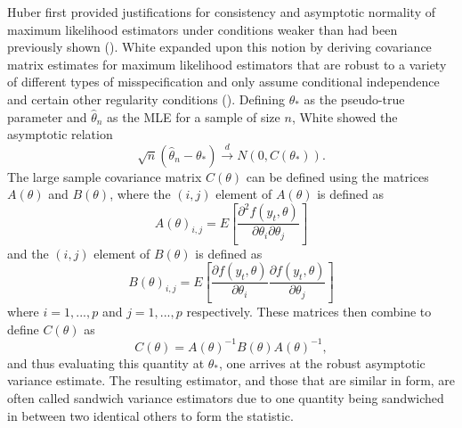 \documentclass[12pt]{article} %
\theoremstyle{definition}
\begin{document}
		Huber first provided justifications for consistency and asymptotic normality of maximum likelihood estimators under conditions weaker than had been previously shown (\cite{Huber}). White
		expanded upon this notion by deriving covariance matrix estimates for maximum likelihood estimators that are robust to a variety of different types of misspecification and only assume
		conditional independence and certain other regularity conditions (\cite{White1980}). Defining $\theta_*$ as the pseudo-true parameter and $\hat{\theta}_n$ as the MLE for a sample of size
		$n$, White showed the asymptotic relation
		\begin{equation*}
			\sqrt{n} (\hat{\theta}_n - \theta_*) \xrightarrow[]{d} N(0, C(\theta_* ) ) .
		\end{equation*}
		The large sample covariance matrix $C(\theta)$ can be defined using the matrices $A(\theta)$ and $B(\theta)$, where the $(i,j)$ element of $A(\theta)$ is defined as
		\begin{equation*}
			A(\theta)_{i,j} = E \left[ \frac{\partial^2 f(y_t,\theta)}{\partial \theta_i \partial \theta_j} \right] 
		\end{equation*}
		and the $(i,j)$ element of $B(\theta)$ is defined as
		\begin{equation*}
			B(\theta)_{i,j} = E \left[ \frac{\partial f(y_t,\theta)}{\partial \theta_i} \frac{\partial f(y_t,\theta)}{\partial \theta_j} \right] 
		\end{equation*}
		where $i = 1,...,p$ and $j = 1,...,p$ respectively. These matrices then combine to define $C(\theta)$ as
		\begin{equation*}
			C(\theta) = A(\theta)^{-1} B(\theta) A(\theta)^{-1} ,
		\end{equation*}
		and thus evaluating this quantity at $\theta_*$, one arrives at the robust asymptotic variance estimate. The resulting estimator, and those that are similar in form, are often called sandwich
		variance estimators due to one quantity being sandwiched in between two identical others to form the statistic.
\end{document}
